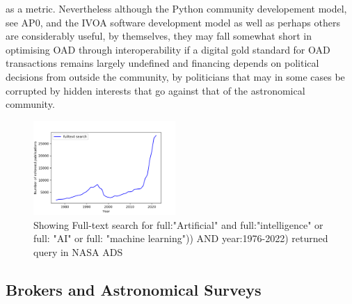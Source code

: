 \documentclass[final,5p,times,twocolumn,authoryear]{elsarticle}
\begin{document}
as a metric.  Nevertheless although the Python community developement model, see AP0, and the IVOA software development model as well as perhaps others are considerably useful, by themselves, they may fall somewhat short in optimising OAD through interoperability if a digital gold standard for OAD transactions remains largely undefined and financing depends on political decisions from outside the community, by politicians that may in some cases be corrupted by hidden interests that go against that of the astronomical community.  
 \begin{figure}
    \centering
    \includegraphics[width=0.48\textwidth]{figs/fulltextai.png}
    \vspace*{-0.4cm}
    \caption{Showing Full-text search for  full:"Artificial" and full:"intelligence" or full: "AI" or full: "machine learning")) AND year:1976-2022) returned query in NASA ADS}
    \label{fig:ai}
\end{figure}


\subsection{ Brokers and Astronomical Surveys}
\end{document}
